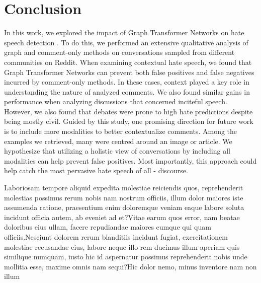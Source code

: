 \documentclass[letterpaper]{article} %
\begin{document}
\vspace{-3.02mm}
\section{Conclusion}
In this work, we explored the impact of Graph Transformer Networks on hate speech detection \cite{hebert2022predicting}. To do this, we performed an extensive qualitative analysis of graph and comment-only methods on conversations sampled from different communities on Reddit. When examining contextual hate speech, we found that Graph Transformer Networks can prevent both false positives and false negatives incurred by comment-only methods. In these cases, context played a key role in understanding the nature of analyzed comments. We also found similar gains in performance when analyzing discussions that concerned inciteful speech. However, we also found that debates were prone to high hate predictions despite being mostly civil.  Guided by this study, one promising direction for future work is to include more modalities to better contextualize comments. Among the examples we retrieved, many were centred around an image or article. We hypothesize that utilizing a holistic view of conversations by including all modalities can help prevent false positives. Most importantly, this approach could help catch the most pervasive hate speech of all - discourse.


Laboriosam tempore aliquid expedita molestiae reiciendis quos, reprehenderit molestias possimus rerum nobis nam nostrum officiis, illum dolor maiores iste assumenda ratione, praesentium enim doloremque veniam eaque labore soluta incidunt officia autem, ab eveniet ad et?Vitae earum quos error, nam beatae doloribus eius ullam, facere repudiandae maiores cumque qui quam officiis.Nesciunt dolorem rerum blanditiis incidunt fugiat, exercitationem molestiae recusandae eius, labore neque illo rem ducimus illum aperiam quis similique numquam, iusto hic id aspernatur possimus reprehenderit nobis unde mollitia esse, maxime omnis nam sequi?Hic dolor nemo, minus inventore nam non illum

\end{document}
